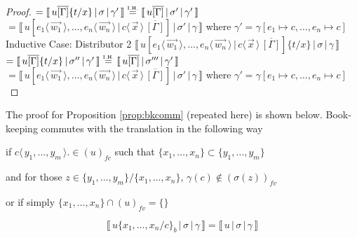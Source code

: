 \documentclass[a4paper,UKenglish,cleveref, autoref]{lipics-v2019}
\newcommand{\fv}[1]{(#1)_{fv}}
\newcommand{\fc}[1]{(#1)_{fc}}
\newcommand{\set}[1]{ \{ #1 \} }
\newcommand{\fake}[3]{#1 \langle \, #2 \, \rangle . #3}
\newcommand{\dist}[5]{#1 [ #2 \, \vert \, \fakedist{#4}{#5} \, #3 ]}
\newcommand{\fakedist}[2]{#1 \langle \, #2 \, \rangle}
\newcommand{\sub}[3]{#1 \{ #2 / #3 \}}
\newcommand{\psub}[3]{#1 \{ #2 / #3 \}_{b}}
\newcommand{\readbackwmap}[3]{\llbracket \, #1 \, \vert \, #2 \, \vert \, #3  \, \rrbracket }
\newcommand{\IH}{\stackrel{\hbox{\tiny I.H.}}{\hbox{=}}}
\begin{document}
\begin{proof}
\newline
$= \readbackwmap{u \overline{[\Gamma]} \sub{}{t}{x}}{\sigma}{\gamma'} \IH \readbackwmap{u \overline{[\Gamma]}}{\sigma'}{\gamma'}$
\newline
$= \readbackwmap{\dist{u}{\fakedist{e_{1}}{\vec{w_{1}}}, \dots, \fakedist{e_{n}}{\vec{w_{n}}}}{\overline{[\Gamma]}}{c}{\vec{x}} }{\sigma'}{\gamma}$
\newline
where
\newline
$\gamma' = \gamma [e_{1} \mapsto c, \dots, e_{n} \mapsto c]$
\newline
\newline
Inductive Case: Distributor 2
\newline
$\readbackwmap{\dist{u}{\fakedist{e_{1}}{\vec{w_{1}}}, \dots, \fakedist{e_{n}}{\vec{w_{n}}}}{\overline{[\Gamma]}}{c}{\vec{x}} \sub{}{t}{x}}{\sigma}{\gamma}$
\newline
$= \readbackwmap{u \overline{[\Gamma]} \sub{}{t}{x}}{\sigma''}{\gamma'} \IH \readbackwmap{u \overline{[\Gamma]}}{\sigma'''}{\gamma'}$
\newline
$= \readbackwmap{\dist{u}{\fakedist{e_{1}}{\vec{w_{1}}}, \dots, \fakedist{e_{n}}{\vec{w_{n}}}}{\overline{[\Gamma]}}{c}{\vec{x}} }{\sigma'}{\gamma}$
\newline
where
\newline
$\gamma' = \gamma [e_{1} \mapsto c, \dots, e_{n} \mapsto c]$
\end{proof}

The proof for Proposition \ref{prop:bkcomm} (repeated here) is shown below. Book-keeping commutes with the translation in the following way

if $\fake{c}{y_{1}, \dots, y_{m}} \in \fc{u}$ such that $\set{x_{1}, \dots, x_{n}} \subset \set{y_{1}, \dots, y_{m}}$

and for those $z \in \set{y_{1}, \dots, y_{m}} / \set{x_{1}, \dots, x_{n}}$, $\gamma(c) \not\in \fv{\sigma(z)}$

or if simply $\set{x_{1}, \dots, x_{n}} \cap \fv{u} = \set{}$

$$\readbackwmap{u \psub{}{x_{1}, \dots, x_{n}}{c}}{\sigma}{\gamma} = \readbackwmap{u}{\sigma}{\gamma}$$
\end{document}

